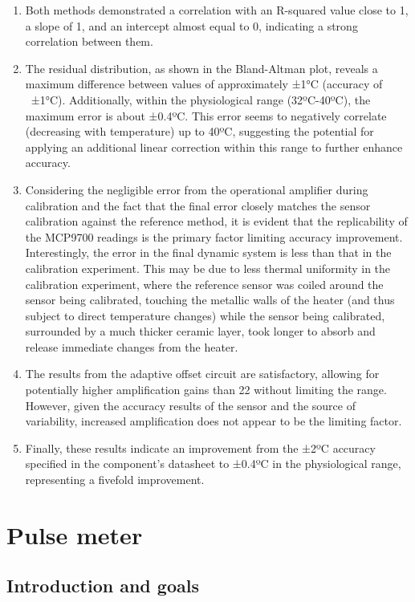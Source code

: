 \documentclass[conference]{IEEEtran}
\begin{document}
      \begin{enumerate}
      \item Both methods demonstrated a correlation with an R-squared value close to 1, a slope of 1, and an intercept almost equal to 0, indicating a strong correlation between them.
      \item The residual distribution, as shown in the Bland-Altman plot, reveals a maximum difference between values of approximately ±1°C (accuracy of ~±1°C). Additionally, within the physiological range (32ºC-40ºC), the maximum error is about ±0.4ºC. This error seems to negatively correlate (decreasing with temperature) up to 40ºC, suggesting the potential for applying an additional linear correction within this range to further enhance accuracy.
      \item Considering the negligible error from the operational amplifier during calibration and the fact that the final error closely matches the sensor calibration against the reference method, it is evident that the replicability of the MCP9700 readings is the primary factor limiting accuracy improvement. 
      Interestingly, the error in the final dynamic system is less than that in the calibration experiment. This may be due to less thermal uniformity in the calibration experiment, 
      where the reference sensor was coiled around the sensor being calibrated, touching the metallic walls of the heater (and thus subject to direct temperature changes) while the 
      sensor being calibrated, surrounded by a much thicker ceramic layer, took longer to absorb and release immediate changes from the heater.
      \item The results from the adaptive offset circuit are satisfactory, allowing for potentially higher amplification gains than 22 without limiting the range. However, given the accuracy results of the sensor and the source of variability, increased amplification does not appear to be the limiting factor.
      \item Finally, these results indicate an improvement from the ±2ºC accuracy specified in the component's datasheet to ±0.4ºC in the physiological range, representing a fivefold improvement. 
      
      \end{enumerate}

\section{Pulse meter} %
   \subsection{Introduction and goals}
\end{document}
